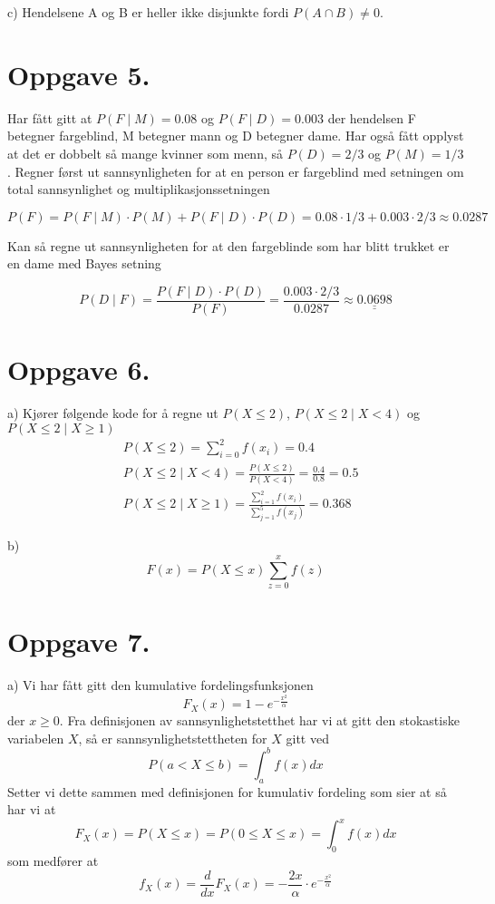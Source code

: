 \documentclass[a4paper,11pt,norsk]{article}
\begin{document}
c) Hendelsene A og B er heller ikke disjunkte fordi $P(A \cap B) \neq 0$.

\section*{Oppgave 5.}
Har fått gitt at $P(F \mid M) = 0.08$ og $P(F \mid D) = 0.003$ der hendelsen F betegner fargeblind,
M betegner mann og D betegner dame. Har også fått opplyst at det er dobbelt så mange kvinner som menn, så
$P(D) = 2/3$ og $P(M) = 1/3$. Regner først ut sannsynligheten for at en person er fargeblind med setningen 
om total sannsynlighet og multiplikasjonssetningen

\[
    P(F) = P(F \mid M) \cdot P(M) + P(F \mid D) \cdot P(D) = 0.08 \cdot 1/3 + 0.003 \cdot 2/3 \approx 0.0287
\]

Kan så regne ut sannsynligheten for at den fargeblinde som har blitt trukket er en dame med Bayes setning

\[
    P(D \mid F) = \frac{P(F \mid D) \cdot P(D)}{P(F)} = \frac{0.003 \cdot 2/3}{0.0287} \approx \underline{\underline{0.0698}}
\]

\section*{Oppgave 6.}
a) Kjører følgende kode for å regne ut $P(X \leq 2)$, $P(X \leq 2 \mid X < 4)$ og $P(X \leq 2 \mid X \geq 1)$
\begin{align*}
    &P(X \leq 2) = \sum_{i=0}^{2}f(x_i) = 0.4 \\
    &P(X \leq 2 \mid X < 4) = \frac{P(X \leq 2)}{P(X < 4)} = \frac{0.4}{0.8} = 0.5 \\ 
    &P(X \leq 2 \mid X \geq 1) = \frac{\sum_{i=1}^{2}f(x_i)}{\sum_{j=1}^{5}f(x_j)} = 0.368 
\end{align*}

b) 
\[
    F(x) = P(X \leq x) \sum_{z=0}^{x}f(z)
\]


\section*{Oppgave 7.}
a) Vi har fått gitt den kumulative fordelingsfunksjonen
\[
    F_{X}(x) = 1 - e^{-\frac{x^2}{\alpha}}
\]
der $x \geq 0$. Fra definisjonen av sannsynlighetstetthet har vi at gitt den stokastiske variabelen $X$, så er 
sannsynlighetstettheten for $X$ gitt ved
\[
    P(a < X \leq b) = \int_{a}^{b}{f(x)dx}
\]
Setter vi dette sammen med definisjonen for kumulativ fordeling som sier at 
så har vi at 
\[
    F_{X}(x) = P(X \leq x) = P(0 \leq X \leq x) = \int_{0}^{x}{f(x)dx}
\]
som medfører at 
\[
    f_{X}(x) = \frac{d}{dx}F_{X}(x) = -\frac{2x}{\alpha} \cdot e^{-\frac{x^2}{\alpha}}
\]
\end{document}
